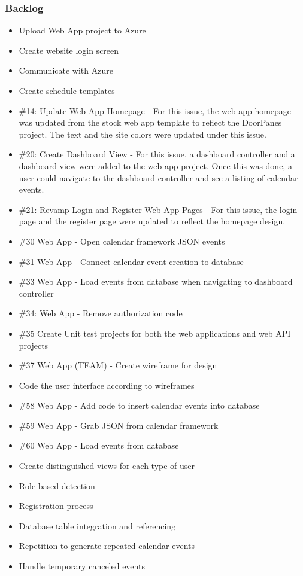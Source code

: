 \subsubsection{Backlog}
\begin{itemize}
\item Upload Web App project to Azure
\item Create website login screen
\item Communicate with Azure
\item Create schedule templates
\item \#14: Update Web App Homepage - For this issue, the web app homepage was updated from the stock web app template to reflect the DoorPanes project. The text and the site colors were updated under this issue.
\item \#20: Create Dashboard View - For this issue, a dashboard controller and a dashboard view were added to the web app project. Once this was done, a user could navigate to the dashboard controller and see a listing of calendar events.
\item \#21: Revamp Login and Register Web App Pages - For this issue, the login page and the register page were updated to reflect the homepage design.
\item \#30 Web App - Open calendar framework JSON events
\item \#31 Web App - Connect calendar event creation to database
\item \#33 Web App - Load events from database when navigating to dashboard controller
\item \#34: Web App - Remove authorization code
\item \#35 Create Unit test projects for both the web applications and web API projects
\item \#37 Web App (TEAM) - Create wireframe for design
\item Code the user interface according to wireframes
\item \#58 Web App - Add code to insert calendar events into database
\item \#59 Web App - Grab JSON from calendar framework
\item \#60 Web App - Load events from database
\item Create distinguished views for each type of user
\item Role based detection
\item Registration process
\item Database table integration and referencing
\item Repetition to generate repeated calendar events
\item Handle temporary canceled events
\end{itemize}


